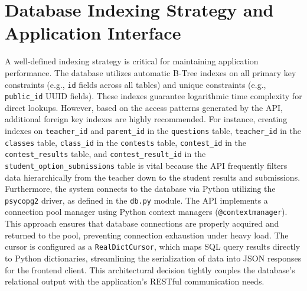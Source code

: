 \documentclass[../report_main.tex]{subfiles}
\begin{document}
\section{Database Indexing Strategy and Application Interface}
A well-defined indexing strategy is critical for maintaining application performance. The database utilizes automatic B-Tree indexes on all primary key constraints (e.g., \texttt{id} fields across all tables) and unique constraints (e.g., \texttt{public_id} \gls{UUID} fields). These indexes guarantee logarithmic time complexity for direct lookups.
However, based on the access patterns generated by the \gls{API}, additional foreign key indexes are highly recommended. For instance, creating indexes on \texttt{teacher_id} and \texttt{parent_id} in the \texttt{questions} table, \texttt{teacher_id} in the \texttt{classes} table, \texttt{class_id} in the \texttt{contests} table, \texttt{contest_id} in the \texttt{contest_results} table, and \texttt{contest_result_id} in the \texttt{student_option_submissions} table is vital because the \gls{API} frequently filters data hierarchically from the teacher down to the student results and submissions.
Furthermore, the system connects to the database via Python utilizing the \texttt{psycopg2} driver, as defined in the \texttt{db.py} module. The \gls{API} implements a connection pool manager using Python context managers (\texttt{@contextmanager}). This approach ensures that database connections are properly acquired and returned to the pool, preventing connection exhaustion under heavy load. The cursor is configured as a \texttt{RealDictCursor}, which maps SQL query results directly to Python dictionaries, streamlining the serialization of data into \gls{JSON} responses for the frontend client. This architectural decision tightly couples the database's relational output with the application's RESTful communication needs.
\end{document}
